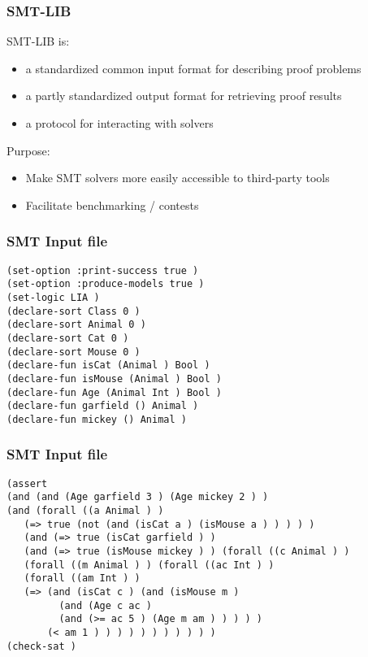 \documentclass{beamer}
\begin{document}
\begin{frame}[fragile]\frametitle{SMT-LIB}

  SMT-LIB is:
  \begin{itemize}
  \item a standardized common input format for describing proof problems
  \item a partly standardized output format for retrieving proof results
  \item a protocol for interacting with solvers
  \end{itemize}

  Purpose: 
  \begin{itemize}
  \item Make SMT solvers more easily accessible to third-party tools
  \item Facilitate benchmarking / contests
  \end{itemize}
\end{frame}


\begin{frame}[fragile]\frametitle{SMT Input file}

\begin{verbatim}
(set-option :print-success true )
(set-option :produce-models true )
(set-logic LIA )
(declare-sort Class 0 )
(declare-sort Animal 0 )
(declare-sort Cat 0 )
(declare-sort Mouse 0 )
(declare-fun isCat (Animal ) Bool )
(declare-fun isMouse (Animal ) Bool )
(declare-fun Age (Animal Int ) Bool )
(declare-fun garfield () Animal )
(declare-fun mickey () Animal )
\end{verbatim}
\end{frame}

  
\begin{frame}[fragile]\frametitle{SMT Input file}

\begin{verbatim}
(assert 
(and (and (Age garfield 3 ) (Age mickey 2 ) ) 
(and (forall ((a Animal ) ) 
   (=> true (not (and (isCat a ) (isMouse a ) ) ) ) ) 
   (and (=> true (isCat garfield ) ) 
   (and (=> true (isMouse mickey ) ) (forall ((c Animal ) ) 
   (forall ((m Animal ) ) (forall ((ac Int ) ) 
   (forall ((am Int ) ) 
   (=> (and (isCat c ) (and (isMouse m ) 
         (and (Age c ac )
         (and (>= ac 5 ) (Age m am ) ) ) ) ) 
       (< am 1 ) ) ) ) ) ) ) ) ) ) )
(check-sat )
\end{verbatim}

\end{frame}
\end{document}
